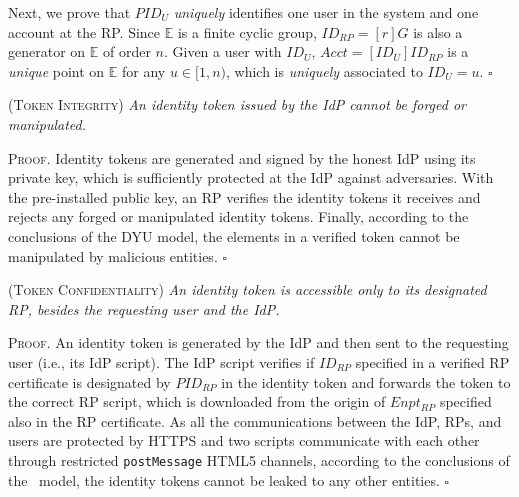 Next, we prove that $PID_{U}$ \emph{uniquely} identifies one user in the system and one account at the RP. Since $\mathbb{E}$ is a finite cyclic group, $ID_{RP} = [r]G$ is also a generator on $\mathbb{E}$ of order $n$. Given a user with $ID_U$, $Acct = [ID_U]ID_{RP}$ is a \emph{unique} point on $\mathbb{E}$ for any $u \in [1, n)$, which is \emph{uniquely} associated to $ID_U=u$. \hfill $\square$


\newc

\begin{thm}
\textsc{(Token Integrity)} \emph{An identity token issued by the IdP cannot be forged or manipulated.}
\label{thm-integrity}
\end{thm}


\noindent \textsc{Proof.} Identity tokens are generated and signed by the honest IdP using its private key, which is sufficiently protected at the IdP against adversaries.
With the pre-installed public key, an RP verifies the identity tokens it receives and rejects any forged or manipulated identity tokens. Finally, according to the conclusions of the DYU model, the elements in a verified token cannot be manipulated by malicious entities.
\hfill $\square$


\begin{thm}
\textsc{(Token Confidentiality)} \emph{An identity token is accessible only to its designated RP, besides the requesting user and the IdP.}
\label{thm-confidentiality}
\end{thm}

\noindent\textsc{Proof.}
An identity token is generated by the IdP and then sent to the requesting user (i.e., its IdP script).
The IdP script verifies if $ID_{RP}$ specified in a verified RP certificate is designated by $PID_{RP}$ in the identity token and forwards the token to the correct RP script, which is downloaded from the origin of $Enpt_{RP}$ specified also in the RP certificate. %
As all the communications between the IdP, RPs, and users are protected by HTTPS and two scripts communicate with each other through restricted \verb+postMessage+ HTML5 channels, according to the conclusions of the \dyu\ model, the identity tokens cannot be leaked to any other entities. \hfill $\square$



